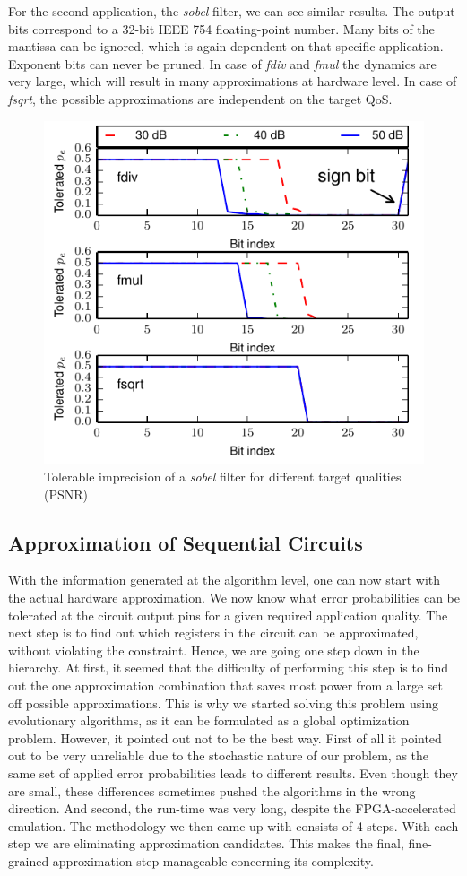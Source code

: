 \documentclass[conference]{IEEEtran}
\begin{document}
For the second application, the \emph{sobel} filter, we can see similar results. The output bits correspond to a 32-bit IEEE 754 floating-point number. Many bits of the mantissa can be ignored, which is again dependent on that specific application. Exponent bits can never be pruned. In case of \emph{fdiv} and \emph{fmul} the dynamics are very large, which will result in many approximations at hardware level. In case of \emph{fsqrt}, the possible approximations are independent on the target QoS.
\begin{figure}[tb]
  \centering
  \includegraphics[width=.48\textwidth]{figs/metrics_sobel}
  \caption{Tolerable imprecision of a \emph{sobel} filter for different target qualities (PSNR)}
  \label{fig:metrics_sobel}
\end{figure}


\subsection{Approximation of Sequential Circuits}
\label{subsec:approximation}
With the information generated at the algorithm level, one can now start with the actual hardware approximation. We now know what error probabilities can be tolerated at the circuit output pins for a given required application quality. The next step is to find out which registers in the circuit can be approximated, without violating the constraint. Hence, we are going one step down in the hierarchy. At first, it seemed that the difficulty of performing this step is to find out the one approximation combination that saves most power from a large set off possible approximations. This is why we started solving this problem using evolutionary algorithms, as it can be formulated as a global optimization problem. However, it pointed out not to be the best way. First of all it pointed out to be very unreliable due to the stochastic nature of our problem, as the same set of applied error probabilities leads to different results. Even though they are small, these differences sometimes pushed the algorithms in the wrong direction. And second, the run-time was very long, despite the FPGA-accelerated emulation. The methodology we then came up with consists of 4 steps. With each step we are eliminating approximation candidates. This makes the final, fine-grained approximation step manageable concerning its complexity.
\end{document}
